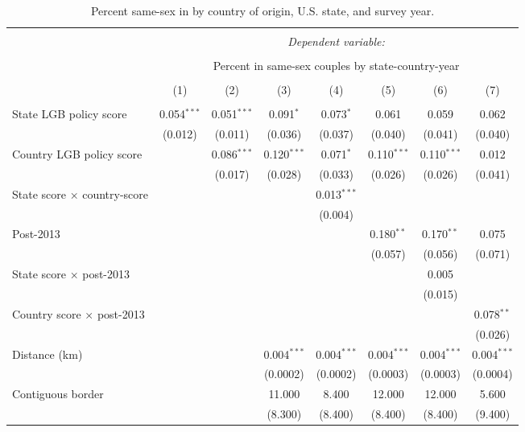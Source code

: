 \documentclass[
  11pt,
]{article}
\begin{document}
\begin{table}[H] \centering 
  \caption{Percent same-sex in by country of origin, U.S. state, and survey year.} 
  \label{tab:state-props-full} 
\footnotesize 
\begin{tabular}{@{\extracolsep{2pt}}lccccccc} 
\\[-1.8ex]\hline 
\hline \\[-1.8ex] 
 & \multicolumn{7}{c}{\textit{Dependent variable:}} \\ 
\cline{2-8} 
\\[-1.8ex] & \multicolumn{7}{c}{Percent in same-sex couples by state-country-year} \\ 
\\[-1.8ex] & (1) & (2) & (3) & (4) & (5) & (6) & (7)\\ 
\hline \\[-1.8ex] 
 State LGB policy score & 0.054$^{***}$ & 0.051$^{***}$ & 0.091$^{*}$ & 0.073$^{*}$ & 0.061 & 0.059 & 0.062 \\ 
  & (0.012) & (0.011) & (0.036) & (0.037) & (0.040) & (0.041) & (0.040) \\ 
  Country LGB policy score &  & 0.086$^{***}$ & 0.120$^{***}$ & 0.071$^{*}$ & 0.110$^{***}$ & 0.110$^{***}$ & 0.012 \\ 
  &  & (0.017) & (0.028) & (0.033) & (0.026) & (0.026) & (0.041) \\ 
  State score × country-score &  &  &  & 0.013$^{***}$ &  &  &  \\ 
  &  &  &  & (0.004) &  &  &  \\ 
  Post-2013 &  &  &  &  & 0.180$^{**}$ & 0.170$^{**}$ & 0.075 \\ 
  &  &  &  &  & (0.057) & (0.056) & (0.071) \\ 
  State score × post-2013 &  &  &  &  &  & 0.005 &  \\ 
  &  &  &  &  &  & (0.015) &  \\ 
  Country score × post-2013 &  &  &  &  &  &  & 0.078$^{**}$ \\ 
  &  &  &  &  &  &  & (0.026) \\ 
  Distance (km) &  &  & 0.004$^{***}$ & 0.004$^{***}$ & 0.004$^{***}$ & 0.004$^{***}$ & 0.004$^{***}$ \\ 
  &  &  & (0.0002) & (0.0002) & (0.0003) & (0.0003) & (0.0004) \\ 
  Contiguous border &  &  & 11.000 & 8.400 & 12.000 & 12.000 & 5.600 \\ 
  &  &  & (8.300) & (8.400) & (8.400) & (8.400) & (9.400) \\ 

\end{tabular}
\end{table}
\end{document}

